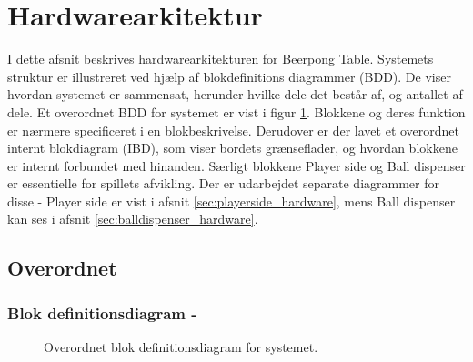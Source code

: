 \documentclass[Arkitektur/System_main.tex]{subfiles}
\begin{document}
\section{Hardwarearkitektur}

I dette afsnit beskrives hardwarearkitekturen for Beerpong Table. Systemets struktur er illustreret ved hjælp af blokdefinitions diagrammer (BDD). De viser hvordan systemet er sammensat, herunder hvilke dele det består af, og antallet af dele. Et overordnet BDD for systemet er vist i figur \ref{fig:overall_hardware_bdd}. Blokkene og deres funktion er nærmere specificeret i en blokbeskrivelse. Derudover er der lavet et overordnet internt blokdiagram (IBD), som viser bordets grænseflader, og hvordan blokkene er internt forbundet med hinanden. Særligt blokkene Player side og Ball dispenser er essentielle for spillets afvikling. Der er udarbejdet separate diagrammer for disse - Player side er vist i afsnit \ref{sec:playerside_hardware}, mens Ball dispenser kan ses i afsnit \ref{sec:balldispenser_hardware}.

\subsection{Overordnet} \label{sec:overall_hardware}
\subsubsection{Blok definitionsdiagram - }
\begin{figure}[H]
    \centering
    \caption{Overordnet blok definitionsdiagram for systemet.}
    \label{fig:overall_hardware_bdd}
\end{figure}
\end{document}
